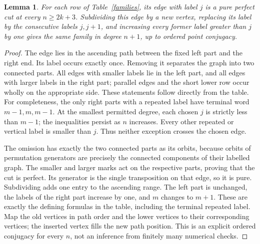 \documentclass[11pt,a4paper]{article}
\newtheorem{lemma}[theorem]{Lemma}
\begin{document}
\begin{lemma}\label{growth}
For each row of Table~\ref{families}, its edge with label $j$ is a
pure perfect cut at every $n\ge2k+3$. Subdividing this edge by a
new vertex, replacing its label by the consecutive labels $j,j+1$,
and increasing every former label greater than $j$ by one gives
the same family in degree $n+1$, up to ordered point conjugacy.
\end{lemma}
\begin{proof}
The edge lies in the ascending path between the fixed left part and
the right end. Its label occurs exactly once. Removing it separates
the graph into two connected parts. All edges with smaller labels
lie in the left part, and all edges with larger labels in the right
part; parallel edges and the short lower row occur wholly on the
appropriate side. These statements follow directly from the table.
For completeness, the only right parts with a repeated label have
terminal word $m-1,m,m-1$. At the smallest permitted degree, each
chosen $j$ is strictly less than $m-1$; the inequalities persist as
$n$ increases. Every other repeated or vertical label is smaller
than $j$. Thus neither exception crosses the chosen edge.

The omission has exactly the two connected parts as its orbits,
because orbits of permutation generators are precisely the connected
components of their labelled graph. The smaller and larger marks
act on the respective parts, proving that the cut is perfect.
Its generator is the single transposition on that edge, so it is pure.
Subdividing adds one entry to the ascending range. The left part
is unchanged, the labels of the right part increase by one, and
$m$ changes to $m+1$. These are exactly the defining formulas in
the table, including the terminal repeated label. Map the old
vertices in path order and the lower vertices to their corresponding
vertices; the inserted vertex fills the new path position. This
is an explicit ordered conjugacy for every $n$, not an inference
from finitely many numerical checks.
\end{proof}
\end{document}

